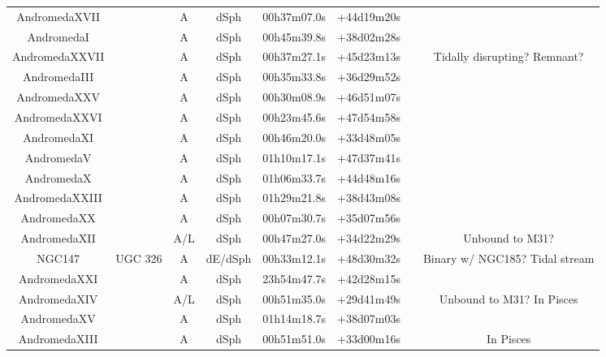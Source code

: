 \begin{table}
\begin{tabular}{cccccccc}
AndromedaXVII        &                          & A & dSph & 00h37m07.0s & +44d19m20s &\cite{irwin2008}&\\
AndromedaI           &                          & A & dSph & 00h45m39.8s & +38d02m28s &\cite{vandenbergh1972a}&\\
AndromedaXXVII       &                          & A & dSph & 00h37m27.1s & +45d23m13s &\cite{richardson2011} & Tidally disrupting? Remnant?\\
AndromedaIII         &                          & A & dSph & 00h35m33.8s & +36d29m52s &\cite{vandenbergh1972a}&\\
AndromedaXXV         &                          & A & dSph & 00h30m08.9s & +46d51m07s &\cite{richardson2011}&\\
AndromedaXXVI        &                          & A & dSph & 00h23m45.6s & +47d54m58s &\cite{richardson2011}&\\
AndromedaXI          &                          & A & dSph & 00h46m20.0s & +33d48m05s &\cite{martin2006}&\\
AndromedaV           &                          & A & dSph & 01h10m17.1s & +47d37m41s &\cite{armandroff1998}&\\
AndromedaX           &                          & A & dSph & 01h06m33.7s & +44d48m16s &\cite{zucker2007}&\\
AndromedaXXIII       &                          & A & dSph & 01h29m21.8s & +38d43m08s &\cite{richardson2011}&\\
AndromedaXX          &                          & A & dSph & 00h07m30.7s & +35d07m56s &\cite{mcconnachie2008b}&\\
AndromedaXII         &                          &A/L& dSph & 00h47m27.0s & +34d22m29s &\cite{martin2006}&Unbound to M31?\\
NGC147               & UGC 326	                 & A &dE/dSph& 00h33m12.1s & +48d30m32s & \cite{herschel1833} &Binary w/ NGC185? Tidal stream\\
AndromedaXXI         &                          & A & dSph & 23h54m47.7s & +42d28m15s &\cite{martin2009}&\\
AndromedaXIV         &                          &A/L& dSph & 00h51m35.0s & +29d41m49s &\cite{majewski2007}&Unbound to M31? In Pisces\\
AndromedaXV          &                          & A & dSph & 01h14m18.7s & +38d07m03s &\cite{ibata2007}&\\
AndromedaXIII        &                          & A & dSph & 00h51m51.0s & +33d00m16s &\cite{martin2006}& In Pisces\\

\end{tabular}
\end{table}
